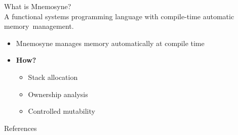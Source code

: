 \documentclass{beamer}
\begin{document}
\begin{frame}
\huge{What is Mnemosyne?}\\
\large{A functional systems programming language with \alert<1->{compile-time automatic memory~management}.}\normalsize
\begin{itemize}
    \item Mnemosyne manages memory automatically at compile time
    \item \textbf{How?}
    \begin{itemize}
    \item<2-> Stack allocation
    \item<2-> Ownership analysis
    \item<2-> Controlled mutability
\end{itemize}
\end{itemize}
\end{frame}

\begin{frame}
    \huge References \normalsize \\

    \printbibliography
\end{frame}
\end{document}
